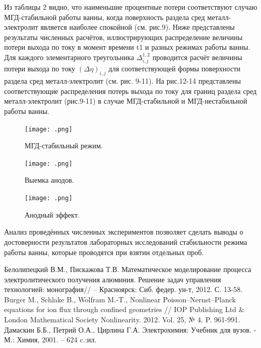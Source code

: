 \documentclass{article}
\begin{document}

Из таблицы 2 видно, что наименьшие процентные потери соответствуют случаю МГД-стабильной работы ванны, когда поверхность раздела сред металл-электролит является наиболее спокойной (см. рис.9).
Ниже представлены результаты численных расчётов, иллюстрирующих распределение величины потери выхода по току в момент времени t1 и разных режимах работы ванны. Для каждого элементарного треугольника $\Delta^{1,2}_{i,j}$ проводится расчёт величины потери выхода по току $(\Delta\eta)_{i,j}$ для соответствующей формы поверхности раздела сред металл-электролит (см. рис. 9-11). На рис.12-14 представлены соответствующие распределения потерь выхода по току для границ раздела сред металл-электролит (рис.9-11) в случае МГД-стабильной и МГД-нестабильной работы ванны. 

\begin{figure}[h!]
    \centering
    \texttt{[image: .png]}
    \caption{МГД-стабильный режим.}
    \label{fig:} 
\end{figure}

\begin{figure}[h!]
    \centering
    \texttt{[image: .png]}
    \caption{Выемка анодов.}
    \label{fig:} 
\end{figure}

\begin{figure}[h!]
    \centering
    \texttt{[image: .png]}
    \caption{Анодный эффект.}
    \label{fig:} 
\end{figure}

Анализ проведённых численных экспериментов позволяет сделать выводы о достоверности результатов лабораторных исследований стабильности режима работы ванны, которые проводятся при взятии отдельных проб.

\begin{thebibliography}{}
 Белолипецкий В.М., Пискажова Т.В. Математическое моделирование процесса электролитического получения алюминия. Решение задач управления технологией: монография// – Красноярск: Сиб. федер. ун-т, 2012. С. 13-58.
 Burger M., Schlake B., Wolfram M.-T., Nonlinear Poisson–Nernst–Planck equations for ion flux through confined geometries // IOP Publishing Ltd & London Mathematical Society Nonlinearity. 2012. Vol. 25, № 4. P. 961-991.
 Дамаскин Б.Б., Петрий О.А., Цирлина Г.А. Электрохимия: Учебник для вузов. -  М.: Химия, 2001. – 624 c.:ил.

\end{thebibliography}
\end{document}
